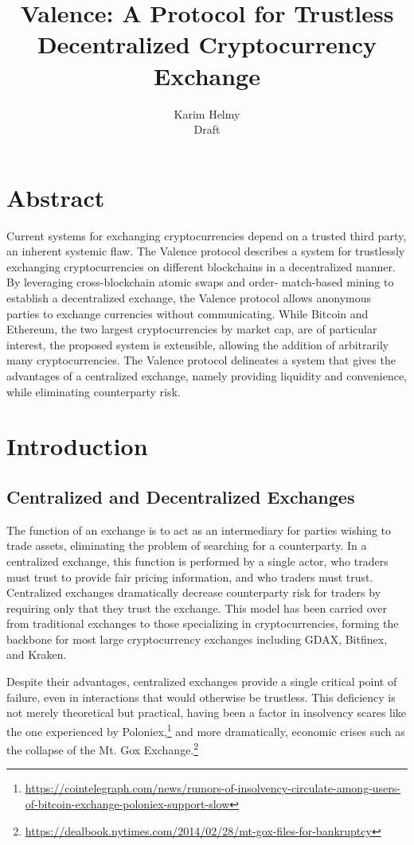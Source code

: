 \documentclass[a4paper]{article}
\title{Valence: A Protocol for Trustless Decentralized
		Cryptocurrency Exchange}
\author{Karim Helmy \\ Draft}
\begin{document}
\maketitle

\section*{Abstract}
	Current systems for exchanging cryptocurrencies depend on a
    trusted third party, an inherent systemic flaw.
    The Valence protocol describes a system for trustlessly
    exchanging cryptocurrencies on different blockchains in a decentralized
    manner. By leveraging cross-blockchain atomic swaps and order-
    match-based mining to establish a decentralized exchange, the
    Valence protocol allows anonymous parties to exchange currencies
    without communicating. While  Bitcoin and Ethereum, the two
    largest cryptocurrencies by market cap, are of particular
    interest, the proposed system is extensible, allowing the
    addition of arbitrarily many cryptocurrencies. The Valence
    protocol delineates a system that gives the advantages of a
    centralized exchange, namely providing liquidity and convenience,
    while eliminating counterparty risk.

\tableofcontents
\newpage
{}
\section*{Introduction}
	\subsection*{Centralized and Decentralized Exchanges}
    The function of an exchange is to act as an intermediary for parties
    wishing to trade assets, eliminating the problem of
    searching for a counterparty. In a centralized exchange, this function
    is performed by a single actor, who traders must trust to provide fair
    pricing information, and who traders must trust. Centralized exchanges
    dramatically decrease counterparty risk for traders by requiring only
    that they trust the exchange. This model has been carried over from
    traditional exchanges to those specializing in cryptocurrencies, forming
    the backbone for most large cryptocurrency exchanges including GDAX,
    Bitfinex, and Kraken.

    Despite their advantages,
	centralized exchanges provide a single critical point of failure,
    even in interactions that would otherwise be trustless. This
    deficiency is not merely theoretical but practical, having been a
    factor in insolvency scares like the one experienced by
    Poloniex,\footnote[1]
    {\url{https://cointelegraph.com/news/rumors-of-insolvency-circulate-among-users-of-bitcoin-exchange-poloniex-support-slow}} and more
    dramatically, economic crises such as the collapse of the Mt. Gox
    Exchange.\footnote[2]
    {\url{https://dealbook.nytimes.com/2014/02/28/mt-gox-files-for-bankruptcy}}
\end{document}
